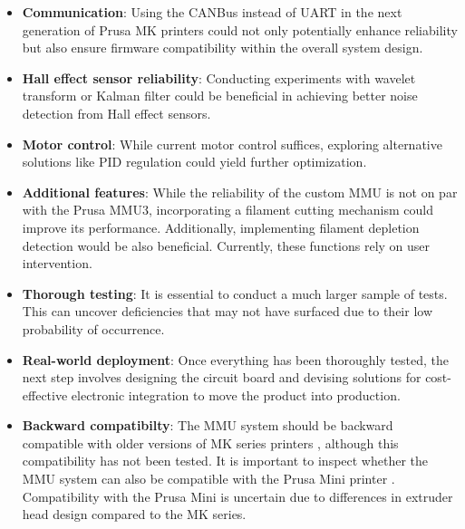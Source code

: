 \begin{itemize}
    \item \textbf{Communication}: Using the CANBus instead of UART in the next generation of Prusa MK printers could not only potentially enhance reliability but also ensure firmware compatibility within the overall system design.
    \item \textbf{Hall effect sensor reliability}: Conducting experiments with wavelet transform or Kalman filter \cite{kalman-filter} could be beneficial in achieving better noise detection from Hall effect sensors.
    \item \textbf{Motor control}: While current motor control suffices, exploring alternative solutions like PID regulation could yield further optimization.
    \item \textbf{Additional features}: While the reliability of the custom MMU is not on par with the Prusa MMU3, incorporating a filament cutting mechanism could improve its performance. Additionally, implementing filament depletion detection would be also beneficial. Currently, these functions rely on user intervention.
    \item \textbf{Thorough testing}: It is essential to conduct a much larger sample of tests. This can uncover deficiencies that may not have surfaced due to their low probability of occurrence.
    \item \textbf{Real-world deployment}: Once everything has been thoroughly tested, the next step involves designing the circuit board and devising solutions for cost-effective electronic integration to move the product into production.
    \item \textbf{Backward compatibilty}: The MMU system should be backward compatible with older versions of MK series printers \cite{prusa-printers}, although this compatibility has not been tested. It is important to inspect whether the MMU system can also be compatible with the Prusa Mini printer \cite{prusa-mini}. Compatibility with the Prusa Mini is uncertain due to differences in extruder head design compared to the MK series.
\end{itemize}

